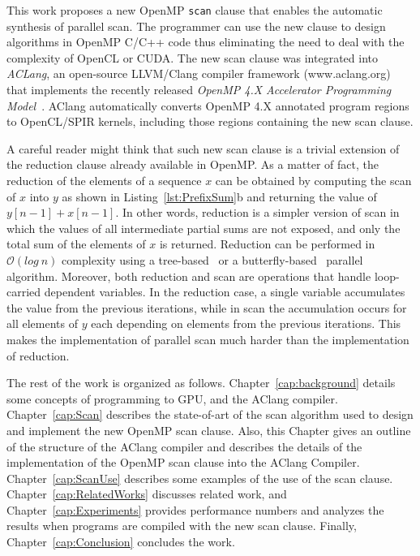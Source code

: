 \documentclass[Ingles]{ic-tese-v1}
\newcommand{\rcap}[1]{Chapter~\ref{cap:#1}}
\newcommand{\rlsts}[2]{Listing~\ref{lst:#1}{#2}}
\begin{document}
This work proposes a new OpenMP \texttt{scan} clause that enables the
automatic synthesis of parallel  scan.  The programmer can
use the new  clause to  design algorithms in OpenMP C/C++ code
thus eliminating the need to deal with  the complexity of OpenCL or CUDA.
The  new   scan  clause   was  integrated  into   \textit{ACLang},  an
open-source LLVM/Clang compiler framework (www.aclang.org) that
implements  the  recently   released  \textit{OpenMP  4.X  Accelerator
	Programming   Model}~\cite{MPereira2017}.     AClang   automatically
converts OpenMP 4.X annotated program regions to OpenCL/SPIR kernels,
including those regions containing the new scan clause.

A careful  reader might think that  such new scan clause  is a trivial
extension of the  reduction clause already available in  OpenMP.  As a
matter of fact, the reduction of the elements of a sequence $x$ can be
obtained  by  computing  the  scan  of   $x$  into  $y$  as  shown  in
\rlsts{PrefixSum}{b} and returning the value of $y[n-1] + x[n-1]$.  In
other  words, reduction  is a  simpler version  of scan  in which  the
values of all intermediate partial sums  are not exposed, and only the
total  sum of  the  elements of  $x$ is  returned.   Reduction can  be
performed    in    $\mathcal{O}(log\    n)$   complexity    using    a
tree-based~\cite{tree-based}                    or                   a
butterfly-based~\cite{butterfly-based} parallel  algorithm.  Moreover,
both  reduction  and  scan  are operations  that  handle  loop-carried
dependent  variables.   In  the  reduction  case,  a  single  variable
accumulates the value from the  previous iterations, while in scan the
accumulation  occurs for  all  elements of  $y$  each depending  on
elements from the previous  iterations.  This makes the implementation
of parallel scan much harder than the implementation of reduction.

The rest of the work is organized as follows. \rcap{background} details
some concepts of programming to GPU, and the AClang compiler. \rcap{Scan}
describes the state-of-art of the scan algorithm used to design and implement
the new OpenMP scan clause. Also, this Chapter gives an outline of the
structure of the AClang compiler and describes the details of the
implementation of the OpenMP scan clause into the AClang Compiler.
\rcap{ScanUse} describes some examples of the use of the scan clause.
\rcap{RelatedWorks} discusses related work, and \rcap{Experiments} provides
performance numbers and analyzes the results when programs are compiled with
the new scan clause. Finally, \rcap{Conclusion} concludes the work.
\end{document}
